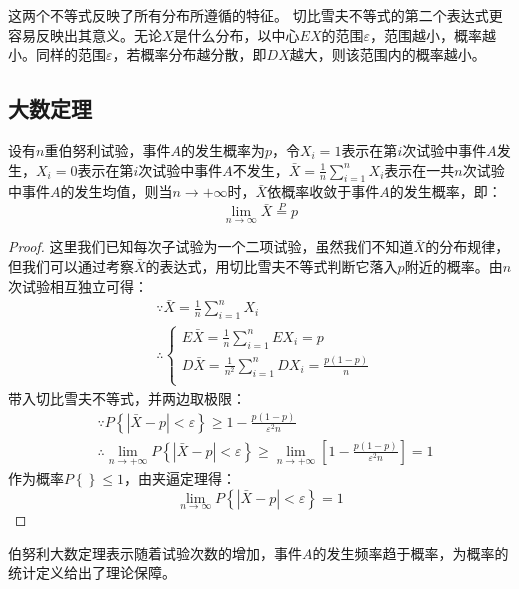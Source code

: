 这两个不等式反映了所有分布所遵循的特征。
切比雪夫不等式的第二个表达式更容易反映出其意义。无论$X$是什么分布，以中心$EX$的范围$\varepsilon $，范围越小，概率越小。同样的范围$\varepsilon $，若概率分布越分散，即$DX$越大，则该范围内的概率越小。

\subsection{大数定理}

\begin{theorem}[伯努利大数定理]
设有$n$重伯努利试验，事件$A$的发生概率为$p$，令$X_i=1$表示在第$i$次试验中事件$A$发生，$X_i=0$表示在第$i$次试验中事件$A$不发生，$\bar{X}=\frac{1}{n}\sum_{i=1}^n{X_i}$表示在一共$n$次试验中事件$A$的发生均值，则当$n\rightarrow +\infty $时，$\bar{X}$依概率收敛于事件$A$的发生概率，即：
\[
\underset{n\rightarrow \infty}{\lim}\bar{X}\overset{P}{=}p
\]
\end{theorem}

\begin{proof}
这里我们已知每次子试验为一个二项试验，虽然我们不知道$\bar{X}$的分布规律，但我们可以通过考察$\bar{X}$的表达式，用切比雪夫不等式判断它落入$p$附近的概率。由$n$次试验相互独立可得：
\begin{align*}
&\because \bar{X}=\frac{1}{n}\sum_{i=1}^n{X_i} \\
&\therefore \begin{cases}
	E\bar{X}=\frac{1}{n}\sum_{i=1}^n{EX_i}=p\\
	D\bar{X}=\frac{1}{n^2}\sum_{i=1}^n{DX_i}=\frac{p\left( 1-p \right)}{n}\\
\end{cases}
\end{align*}
带入切比雪夫不等式，并两边取极限：
\begin{align*}
&\because P\left\{ \left| \bar{X}-p \right|<\varepsilon \right\} \geqslant 1-\frac{p\left( 1-p \right)}{\varepsilon ^2n} \\
&\therefore \underset{n\rightarrow +\infty}{\lim}P\left\{ \left| \bar{X}-p \right|<\varepsilon \right\} \geqslant \underset{n\rightarrow +\infty}{\lim}\left[ 1-\frac{p\left( 1-p \right)}{\varepsilon ^2n} \right] =1
\end{align*}
作为概率$P\left\{  \right\} \leqslant 1$，由夹逼定理得：
\[
\underset{n\rightarrow \infty}{\lim}P\left\{ \left| \bar{X}-p \right|<\varepsilon \right\} =1
\]
\end{proof}

伯努利大数定理表示随着试验次数的增加，事件$A$的发生频率趋于概率，为概率的统计定义给出了理论保障。

